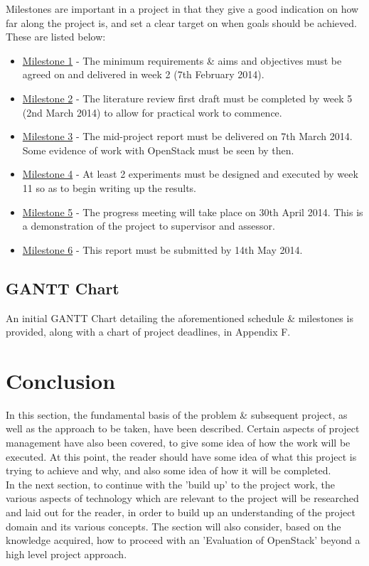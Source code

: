 Milestones are important in a project in that they give a good indication on how far along the project is, and set a clear target on when goals should be achieved. These are listed below:

\begin{itemize}
\itemsep0em
\item \underline{Milestone 1} - The minimum requirements \& aims and objectives must be agreed on and delivered in week 2 (7th February 2014). 
\item \underline{Milestone 2} - The literature review first draft must be completed by week 5 (2nd March 2014) to allow for practical work to commence. 
\item \underline{Milestone 3} - The mid-project report must be delivered on 7th March 2014. Some evidence of work with OpenStack must be seen by then. 
\item \underline{Milestone 4} - At least 2 experiments must be designed and executed by week 11 so as to begin writing up the results. 
\item \underline{Milestone 5} - The progress meeting will take place on 30th April 2014. This is a demonstration of the project to supervisor and assessor. 
\item \underline{Milestone 6} - This report must be submitted by 14th May 2014. 

\end{itemize}

\subsection*{GANTT Chart}

An initial GANTT Chart detailing the aforementioned schedule \& milestones is provided, along with a chart of project deadlines, in Appendix F. 

\section{Conclusion}

In this section, the fundamental basis of the problem \& subsequent project, as well as the approach to be taken, have been described. Certain aspects of project management have also been covered, to give some idea of how the work will be executed. At this point, the reader should have some idea of what this project is trying to achieve and why, and also some idea of how it will be completed. \\

In the next section, to continue with the 'build up' to the project work, the various aspects of technology which are relevant to the project will be researched and laid out for the reader, in order to build up an understanding of the project domain and its various concepts. The section will also consider, based on the knowledge acquired, how to proceed with an 'Evaluation of OpenStack' beyond a high level project approach. 